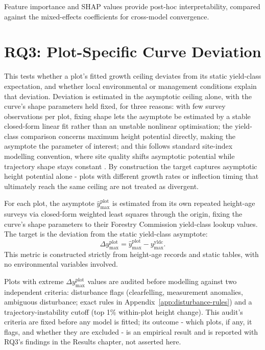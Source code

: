 \documentclass[logo,msc,ai]{infthesis}           %
\begin{document}
Feature importance and SHAP values provide post-hoc interpretability, compared against the mixed-effects coefficients for cross-model convergence. %

\section{RQ3: Plot-Specific Curve Deviation}
\label{sec:rq3-target}
This tests whether a plot's fitted growth ceiling deviates from its static yield-class expectation, and whether local environmental or management conditions explain that deviation. Deviation is estimated in the asymptotic ceiling alone, with the curve's shape parameters held fixed, for three reasons: with few survey observations per plot, fixing shape lets the asymptote be estimated by a stable closed-form linear fit rather than an unstable nonlinear optimisation; the yield-class comparison concerns maximum height potential directly, making the asymptote the parameter of interest; and this follows standard site-index modelling convention, where site quality shifts asymptotic potential while trajectory shape stays constant \cite{socha2021Regional_C2_CR}. By construction the target captures asymptotic height potential alone - plots with different growth rates or inflection timing that ultimately reach the same ceiling are not treated as divergent.


For each plot, the asymptote $\hat{y}_{\max}^{\text{plot}}$ is estimated from its own repeated height-age surveys via closed-form weighted least squares through the origin, fixing the curve's shape parameters to their Forestry Commission yield-class lookup values. The target is the deviation from the static yield-class asymptote:
\begin{equation}
\Delta y_{\max}^{\text{plot}} = \hat y_{\max}^{\text{plot}} - y_{\max}^{\text{yldc}}.
\label{eq:local-ymax-diff}
\end{equation}
This metric is constructed strictly from height-age records and static tables, with no environmental variables involved.

Plots with extreme $\Delta y_{\max}^{\text{plot}}$ values are audited before modelling against two independent criteria: disturbance flags (clearfelling, measurement anomalies, ambiguous disturbance; exact rules in Appendix~\ref{app:disturbance-rules}) and a trajectory-instability cutoff (top 1\% within-plot height change). This audit's criteria are fixed before any model is fitted; its outcome - which plots, if any, it flags, and whether they are excluded - is an empirical result and is reported with RQ3's findings in the Results chapter, not asserted here. %
\end{document}

